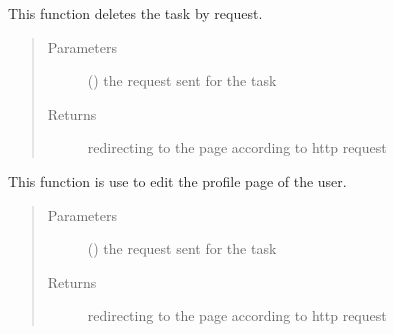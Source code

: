 \documentclass[letterpaper,10pt,english]{sphinxmanual}
\begin{document}
\begin{fulllineitems}
\label{\detokenize{janta:janta.views.delete_task}}
This function deletes the task by request.
\begin{quote}\begin{description}
\item[{Parameters}] \leavevmode
{} () \textendash{} the request sent for the task

\item[{Returns}] \leavevmode
redirecting to the page according to http request

\end{description}\end{quote}

\end{fulllineitems}


\begin{fulllineitems}
\label{\detokenize{janta:janta.views.edit_profile}}
This function is use to edit the profile page of the user.
\begin{quote}\begin{description}
\item[{Parameters}] \leavevmode
{} () \textendash{} the request sent for the task

\item[{Returns}] \leavevmode
redirecting to the page according to http request

\end{description}\end{quote}

\end{fulllineitems}

\end{document}
